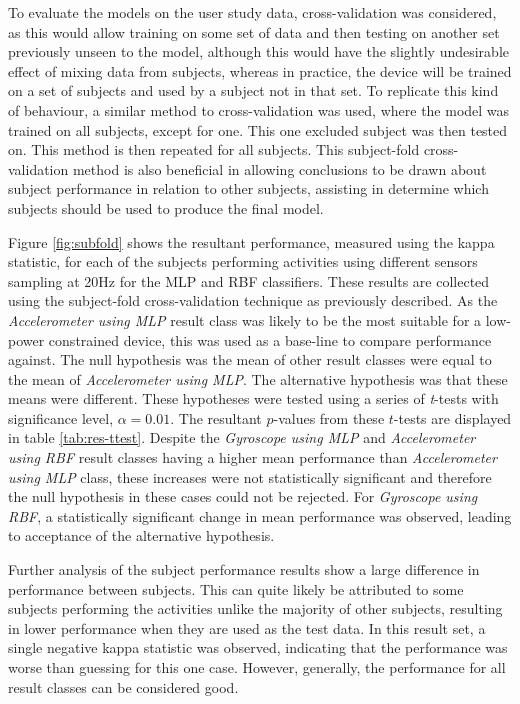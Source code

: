To evaluate the models on the user study data, cross-validation was considered, as this would allow training on some set of data and then testing on another set previously unseen to the model, although this would have the slightly undesirable effect of mixing data from subjects, whereas in practice, the device will be trained on a set of subjects and used by a subject not in that set. To replicate this kind of behaviour, a similar method to cross-validation was used, where the model was trained on all subjects, except for one. This one excluded subject was then tested on. This method is then repeated for all subjects. This subject-fold cross-validation method is also beneficial in allowing conclusions to be drawn about subject performance in relation to other subjects, assisting in determine which subjects should be used to produce the final model.

Figure \ref{fig:subfold} shows the resultant performance, measured using the kappa statistic, for each of the subjects performing activities using different sensors sampling at 20Hz for the MLP and RBF classifiers. These results are collected using the subject-fold cross-validation technique as previously described. As the \textit{Accelerometer using MLP} result class was likely to be the most suitable for a low-power constrained device, this was used as a base-line to compare performance against. The null hypothesis was the mean of other result classes were equal to the mean of \textit{Accelerometer using MLP}. The alternative hypothesis was that these means were different. These hypotheses were tested using a series of \textit{t}-tests with significance level, $\alpha = 0.01$. The resultant $p$-values from these $t$-tests are displayed in table \ref{tab:res-ttest}. Despite the \textit{Gyroscope using MLP} and \textit{Accelerometer using RBF} result classes having a higher mean performance than \textit{Accelerometer using MLP} class, these increases were not statistically significant and therefore the null hypothesis in these cases could not be rejected. For \textit{Gyroscope using RBF}, a statistically significant change in mean performance was observed, leading to acceptance of the alternative hypothesis.

Further analysis of the subject performance results show a large difference in performance between subjects. This can quite likely be attributed to some subjects performing the activities unlike the majority of other subjects, resulting in lower performance when they are used as the test data. In this result set, a single negative kappa statistic was observed, indicating that the performance was worse than guessing for this one case. However, generally, the performance for all result classes can be considered good.

